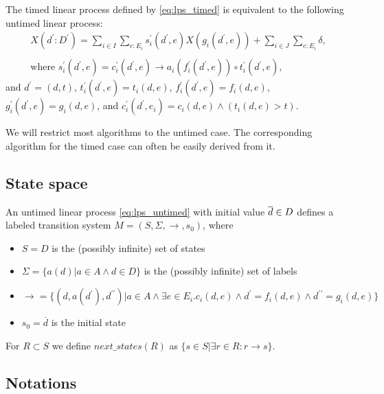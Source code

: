 \documentclass{article}
\begin{document}
The timed linear process defined by \ref{eq:lps_timed} is equivalent to the
following untimed linear process:%
\[
\begin{array}{l}
X(d^{\prime }:D^{\prime })=\sum\limits_{i\in
I}\sum\limits_{e:E_{i}}s_{i}^{\prime }(d^{\prime },e)X(g_{i}(d^{\prime
},e))+\sum\limits_{i\in J}\sum\limits_{e:E_{i}}\delta , \\
\\
\text{where }s_{i}^{\prime }(d^{\prime },e)=c_{i}^{\prime }(d^{\prime
},e)\rightarrow a_{i}(f_{i}^{\prime }(d^{\prime },e))\circ t_{i}^{\prime
}(d^{\prime },e),%
\end{array}%
\]%
and $d^{\prime }=(d,t)$, $t_{i}^{\prime }(d^{\prime },e)=t_{i}(d,e)$, $%
f_{i}^{\prime }(d^{\prime },e)=f_{i}(d,e)$, $g_{i}^{\prime }(d^{\prime
},e)=g_{i}(d,e)$, and $c_{i}^{\prime }(d^{\prime },e_{i})=c_{i}(d,e)\wedge
(t_{i}(d,e)>t)$.

We will restrict most algorithms to the untimed case. The corresponding
algorithm for the timed case can often be easily derived from it.

\subsection{State space}

An untimed linear process \ref{eq:lps_untimed} with initial value $\overline{%
d}\in D$ defines a labeled transition system $M=(S,\Sigma ,\rightarrow
,s_{0})$, where

\begin{itemize}
\item $S=D$ is the (possibly infinite) set of states

\item $\Sigma =\{a(d)|a\in A\wedge d\in D\}$ is the (possibly infinite) set
of labels

\item $\rightarrow =\{(d,a(d^{\prime }),d^{\prime \prime })|a\in A\wedge
\exists e\in E_{i}.c_{i}(d,e)\wedge d^{\prime }=f_{i}(d,e)\wedge d^{\prime
\prime }=g_{i}(d,e)\}$

\item $s${}$_{0}=\overline{d}$ is the initial state
\end{itemize}

For $R\subset S$ we define $next\_states(R)$ as $\{s\in S|\exists r\in
R:r\rightarrow s\}$.

\subsection{Notations}
\end{document}
